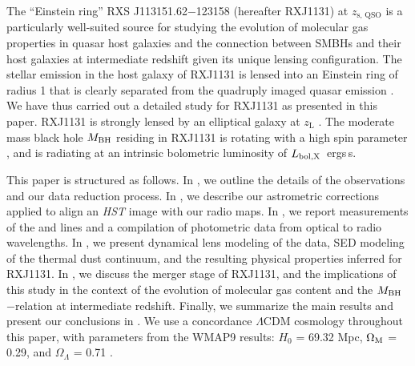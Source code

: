 \documentclass[]{emulateapj}
\begin{document}
The ``Einstein ring'' RXS J113151.62$-$123158 (hereafter RXJ1131) 
at $z_\textrm{s, QSO}$ \citep[hereafter S03]{Sluse03a} is a particularly well-suited source for
studying the evolution of molecular gas properties in quasar host galaxies and the 
connection between SMBHs and their host galaxies at intermediate redshift
given its unique lensing configuration.
The stellar emission in the host galaxy of RXJ1131 is lensed into
an Einstein ring of radius 1
that is clearly separated from the quadruply imaged quasar emission \citep[hereafter C06]{Claeskens06a}.
We have thus carried out a detailed study for RXJ1131 as presented in this paper.
RXJ1131 is strongly lensed by an elliptical galaxy at $z_\textrm{L}$ .
The moderate mass black hole $M_{\rm BH}$\Msun \citep{Sluse12a} %
residing in RXJ1131 is rotating with a high spin parameter \citep[$a$\,$\sim$\,0.9;][]{Reis14a}, and
is radiating at an intrinsic bolometric luminosity of $L_{\rm bol, X}$\, ergs\,s\pmOne \citep{Pooley07a}.

This paper is structured as follows.
In , we outline the details of the observations and our data reduction process.
In , we describe our astrometric corrections applied to align an {\it HST} image with our radio maps.
In , we report measurements of the \bco and \cco lines and a compilation of photometric data from optical to radio wavelengths.
In , we present dynamical lens modeling of the \bco data, SED modeling of the thermal dust continuum, 
and the resulting physical properties inferred for RXJ1131.
In , we discuss the merger stage of RXJ1131, and the implications of 
this study in the context of the evolution of molecular gas content
and the $M_{\rm BH}$$-$\mdyn relation at intermediate redshift.
Finally, we summarize the main results and present our conclusions in .
We use a concordance $\Lambda$CDM cosmology throughout this paper, with
parameters from the WMAP9 results:
$H_0$ = 69.32 \kms Mpc\pmOne, $\Omega_{\rm M}$ = 0.29, and
$\Omega_{\Lambda}$ = 0.71 \citep{Hinshaw13a}.

\end{document}
